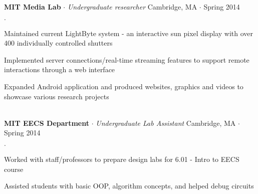 \documentclass{article}
\newcommand{\employer}[4]{{ \textbf{#1} $\cdot$ \emph{#3} \hfill #4 $\cdot$ #2 }}
\newenvironment{achievements}{\begin{list}{$\cdot$}{\topsep 0pt \itemsep -2pt}}{\vspace*{4pt}\end{list}}
\begin{document}
\employer{MIT Media Lab}{Spring 2014}{Undergraduate researcher}{Cambridge, MA}
    \begin{achievements}
                \item{Maintained current LightByte system - an interactive sun pixel display with over 400 individually controlled shutters }
                \item { Implemented server connections/real-time streaming features to support remote interactions through a web interface }
                \item{Expanded Android application and produced websites, graphics and videos to showcase various research projects }

    \end{achievements}
  \\

\employer{MIT EECS Department}{Spring 2014}{Undergraduate Lab Assistant}{Cambridge, MA}
    \begin{achievements}
                \item{Worked with staff/professors to prepare design labs for 6.01 - Intro to EECS course}
                \item{Assisted students with basic OOP, algorithm concepts, and helped debug circuits}

    \end{achievements}





\end{document}
